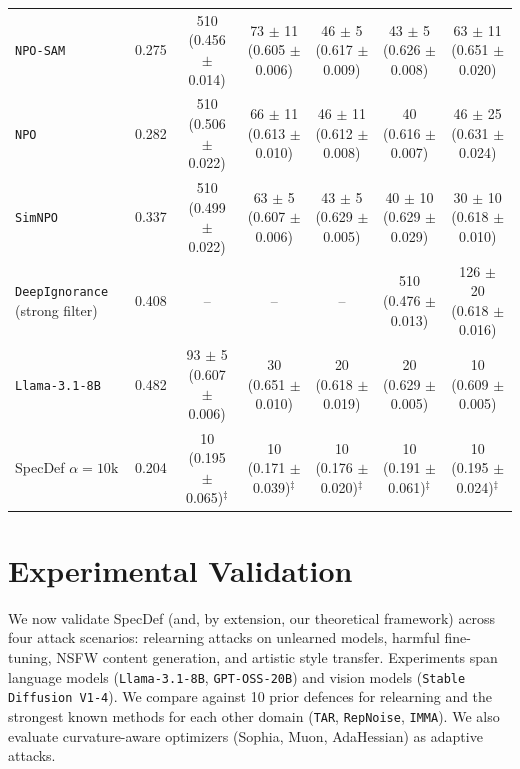 \documentclass{article}
\theoremstyle{plain}
\theoremstyle{definition}
\theoremstyle{remark}
\begin{document}
\begin{table}[t!]
\begin{sc}
{\begin{tabular}{lcccccc}
\texttt{NPO-SAM} & 0.275 & 510 (0.456 $\pm$ 0.014) & 73 $\pm$ 11 (0.605 $\pm$ 0.006) & 46 $\pm$ 5 (0.617 $\pm$ 0.009) & 43 $\pm$ 5 (0.626 $\pm$ 0.008) & 63 $\pm$ 11 (0.651 $\pm$ 0.020) \\
\texttt{NPO} & 0.282 & 510 (0.506 $\pm$ 0.022) & 66 $\pm$ 11 (0.613 $\pm$ 0.010) & 46 $\pm$ 11 (0.612 $\pm$ 0.008) & 40 (0.616 $\pm$ 0.007) & 46 $\pm$ 25 (0.631 $\pm$ 0.024) \\
\texttt{SimNPO} & 0.337 & 510 (0.499 $\pm$ 0.022) & 63 $\pm$ 5 (0.607 $\pm$ 0.006) & 43 $\pm$ 5 (0.629 $\pm$ 0.005) & 40 $\pm$ 10 (0.629 $\pm$ 0.029) & 30 $\pm$ 10 (0.618 $\pm$ 0.010) \\
\texttt{DeepIgnorance} (strong filter) & 0.408 & -- & -- & -- & 510 (0.476 $\pm$ 0.013) & 126 $\pm$ 20 (0.618 $\pm$ 0.016) \\
\texttt{Llama-3.1-8B} & 0.482 & 93 $\pm$ 5 (0.607 $\pm$ 0.006) & 30 (0.651 $\pm$ 0.010) & 20 (0.618 $\pm$ 0.019) & 20 (0.629 $\pm$ 0.005) & 10 (0.609 $\pm$ 0.005) \\
\midrule
\rowcolor{green!10}
SpecDef $\alpha=10\mathrm{k}$ & 0.204 & 10 (0.195 $\pm$ 0.065)$^{\ddagger}$ & 10 (0.171 $\pm$ 0.039)$^{\ddagger}$ & 10 (0.176 $\pm$ 0.020)$^{\ddagger}$ & 10 (0.191 $\pm$ 0.061)$^{\ddagger}$ & 10 (0.195 $\pm$ 0.024)$^{\ddagger}$ \\
\bottomrule
\end{tabular}
}
\end{sc}
\end{table}

\section{Experimental Validation}
\label{sec:empirical-results}
We now validate SpecDef (and, by extension, our theoretical framework) across four attack scenarios: relearning attacks on unlearned models, harmful fine-tuning, NSFW content generation, and artistic style transfer. Experiments span language models (\texttt{Llama-3.1-8B}, \texttt{GPT-OSS-20B}) and vision models (\texttt{Stable Diffusion V1-4}). We compare against 10 prior defences for relearning and the strongest known methods for each other domain (\texttt{TAR}, \texttt{RepNoise}, \texttt{IMMA}). We also evaluate curvature-aware optimizers (Sophia, Muon, AdaHessian) as adaptive attacks.
\end{document}
